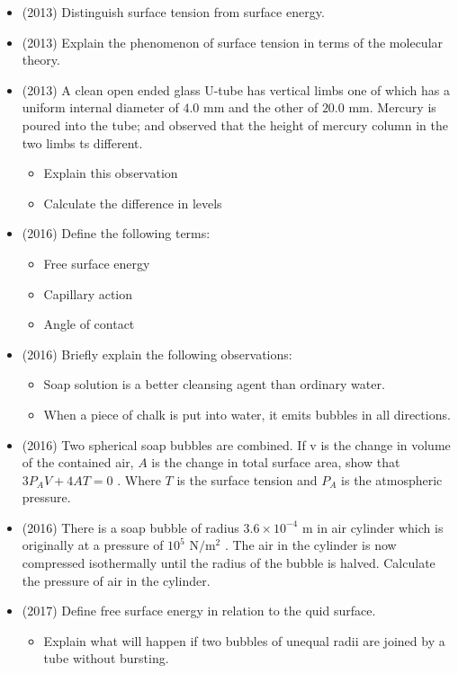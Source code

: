 \documentclass{article}
\begin{document}
\begin{itemize}
\begin{itemize}
\end{itemize}
\item (2013)  Distinguish surface tension from surface energy.
\item (2013)  Explain the phenomenon of surface tension in terms of the molecular theory.
\item (2013)  A clean open ended glass U-tube has vertical limbs one of which has a uniform internal diameter of $ 4.0$ mm and the other of $ 20.0$ mm. Mercury is poured into the tube; and observed that the height of mercury column in the two limbs ts different.
 \begin{itemize}
\item Explain this observation
\item Calculate the difference in levels
\end{itemize}
\item (2016)  Define the following terms:
 \begin{itemize}
\item Free surface energy
\item Capillary action
\item Angle of contact
\end{itemize}
\item (2016)  Briefly explain the following observations:
 \begin{itemize}
\item Soap solution is a better cleansing agent than ordinary water.
\item When a piece of chalk is put into water, it emits bubbles in all directions.
\end{itemize}
\item (2016)  Two spherical soap bubbles are combined.  If v is the change in volume of the contained air, $ A$ is the change in total surface area, show that $ 3P_{A}V+4A T=0$ . Where $ T$ is the surface tension and $ P_{A}$ is the atmospheric pressure.
\item (2016)  There is a soap bubble of radius $ 3.6 \times 10^{-4}$ m in air cylinder which is originally at a pressure of $ 10^{5}$ N$/$m$ ^{2}$ . The air in the cylinder is now compressed isothermally until the radius of the bubble is halved. Calculate the pressure of air in the cylinder.
\item (2017)  Define free surface energy in relation to the quid surface.
 \begin{itemize}
\item Explain what will happen if two bubbles of unequal radii are joined by a tube without bursting. 

\end{itemize}
\end{itemize}
\end{document}
